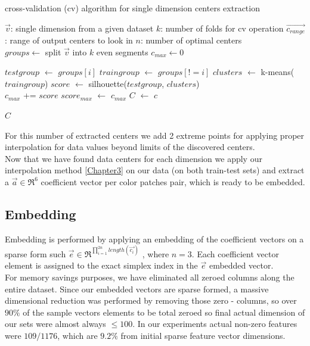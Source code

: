 \begin{algorithm}
	\caption{cross-validation (cv) algorithm for single dimension centers extraction}
	\begin{algorithmic}		
		
		\REQUIRE $\overrightarrow{v}$: single dimension from a given dataset 
		\REQUIRE $k$: number of folds for cv operation
		\REQUIRE $\overrightarrow{c_{range}}$: range of output centers to look in
		\ENSURE $n$: number of optimal centers\\
		\STATE $groups \leftarrow$ split $\overrightarrow{v}$ into $k$ even segments
		\STATE $c_{max} \leftarrow 0$  
		
		\STATE $test group$ $\leftarrow$ $groups[i]$
		\STATE $train group$ $\leftarrow$ $groups[!=i]$		
		\STATE $clusters$ $\leftarrow$ k-means($train group$)
		\STATE $score$ $\leftarrow$ silhouette($test group$, $clusters$)\\
		\STATE $c_{max}$ += $score$
		\ENDFOR
			\STATE $score_{max}$ $\leftarrow$ $c_{max}$
			\STATE $C$ $\leftarrow$ $c$
			\ENDIF
		\ENDFOR	

		

		\RETURN $C$
		
		
	\end{algorithmic}
\end{algorithm}	


For this number of extracted centers we add 2 extreme points for applying proper interpolation for data values beyond limits of the discovered centers.
\\
Now that we have found data centers for each dimension we apply our interpolation method \ref{Chapter3} on our data (on both train-test sets) and extract a $\overrightarrow{a} \in \Re^6$ coefficient vector per color patches pair, which is ready to be embedded.


\subsection{Embedding}
Embedding is performed by applying an embedding of the coefficient vectors on a sparse form such $\overrightarrow{e} \in \Re^{\prod_{i=1}^{2n}{length(\overrightarrow{c_i})}}$ , where $n = 3$.
Each coefficient vector element is assigned to the exact simplex index in the $\overrightarrow{e}$ embedded vector.
\\
For memory savings purposes, we have eliminated all zeroed columns along the entire dataset.
Since our embedded vectors are sparse formed, a massive dimensional reduction was performed by removing those zero - columns, so over $90 \% $ of the sample vectors elements to be total zeroed so final actual dimension of our sets were almost always $ \le 100$. In our experiments actual non-zero features were $109/1176$, which are $9.2 \%$ from initial sparse feature vector dimensions.

